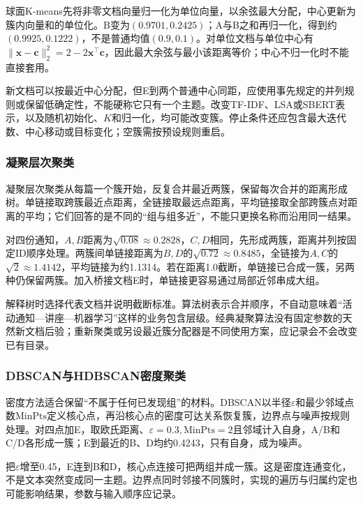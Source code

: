 球面K-means先将非零文档向量归一化为单位向量，以余弦最大分配，中心更新为簇内向量和的单位化。B变为$(0.9701,0.2425)$；A与B之和再归一化，得到约$(0.9925,0.1222)$，不是普通均值$(0.9,0.1)$。对单位文档与单位中心有$\|\bm x-\bm c\|_2^2=2-2\bm x^\top\bm c$，因此最大余弦与最小该距离等价；中心不归一化时不能直接套用。

新文档可以按最近中心分配，但E到两个普通中心同距，应使用事先规定的并列规则或保留低确定性，不能硬称它只有一个主题。改变TF-IDF、LSA或SBERT表示，以及随机初始化、$K$和归一化，均可能改变簇。停止条件还应包含最大迭代数、中心移动或目标变化；空簇需按预设规则重启。

\subsubsection{凝聚层次聚类}
\label{sec:nlp-classification-hierarchical}

凝聚层次聚类从每篇一个簇开始，反复合并最近两簇，保留每次合并的距离形成树。单链接取跨簇最近点距离，全链接取最远点距离，平均链接取全部跨簇点对距离的平均；它们回答的是不同的“组与组多近”，不能只更换名称而沿用同一结果。

对四份通知，$A,B$距离为$\sqrt{0.08}\approx0.2828$，$C,D$相同，先形成两簇，距离并列按固定ID顺序处理。两簇间单链接距离为$B,D$的$\sqrt{0.72}\approx0.8485$，全链接为$A,C$的$\sqrt2\approx1.4142$，平均链接为约1.1314。若在距离1.0截断，单链接已合成一簇，另两种仍保留两簇。加入桥接文档E时，单链接更容易通过局部近邻串成大组。

解释树时选择代表文档并说明截断标准。算法树表示合并顺序，不自动意味着“活动通知—讲座—机器学习”这样的业务包含层级。经典凝聚算法没有固定参数的天然新文档后验；重新聚类或另设最近簇分配器是不同使用方案，应记录会不会改变已有目录。

\subsubsection{DBSCAN与HDBSCAN密度聚类}
\label{sec:nlp-classification-density}

密度方法适合保留“不属于任何已发现组”的材料。DBSCAN以半径$\varepsilon$和最少邻域点数$\mathrm{MinPts}$定义核心点，再沿核心点的密度可达关系恢复簇，边界点与噪声按规则处理。对四点加E，取欧氏距离、$\varepsilon=0.3,\mathrm{MinPts}=2$且邻域计入自身，A/B和C/D各形成一簇；E到最近的B、D均约0.4243，只有自身，成为噪声。

把$\varepsilon$增至0.45，E连到B和D，核心点连接可把两组并成一簇。这是密度连通变化，不是文本突然变成同一主题。边界点同时邻接不同簇时，实现的遍历与归属约定也可能影响结果，参数与输入顺序应记录。

